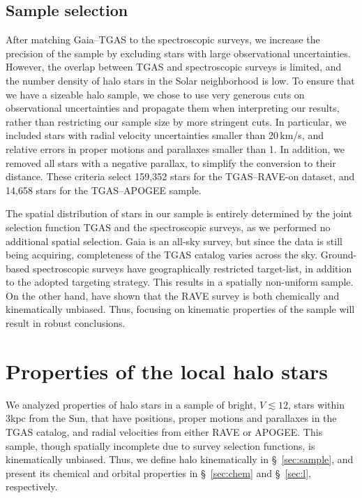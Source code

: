 \documentclass[apj, twocolappendix, numberedappendix, appendixfloats]{emulateapj}
\begin{document}
\subsection{Sample selection}
\label{sample}
After matching Gaia--TGAS to the spectroscopic surveys, we increase the precision of the sample by excluding stars with large observational uncertainties.
However, the overlap between TGAS and spectroscopic surveys is limited, and the number density of halo stars in the Solar neighborhood is low.
To ensure that we have a sizeable halo sample, we chose to use very generous cuts on observational uncertainties and propagate them when interpreting our results, rather than restricting our sample size by more stringent cuts.
In particular, we included stars with radial velocity uncertainties smaller than 20\,km/s, and relative errors in proper motions and parallaxes smaller than 1.
In addition, we removed all stars with a negative parallax, to simplify the conversion to their distance.
These criteria select 159,352 stars for the TGAS--RAVE-on dataset, and 14,658 stars for the TGAS--APOGEE sample.

The spatial distribution of stars in our sample is entirely determined by the joint selection function TGAS and the spectroscopic surveys, as we performed no additional spatial selection.
Gaia is an all-sky survey, but since the data is still being acquiring, completeness of the TGAS catalog varies across the sky.
Ground-based spectroscopic surveys have geographically restricted target-list, in addition to the adopted targeting strategy.
This results in a spatially non-uniform sample.
On the other hand, \citet{wojno2016} have shown that the RAVE survey is both chemically and kinematically unbiased.
Thus, focusing on kinematic properties of the sample will result in robust conclusions.

\section{Properties of the local halo stars}
We analyzed properties of halo stars in a sample of bright, $V\lesssim12$, stars within 3\;kpc from the Sun, that have positions, proper motions and parallaxes in the TGAS catalog, and radial velocities from either RAVE or APOGEE.
This sample, though spatially incomplete due to survey selection functions, is kinematically unbiased.
Thus, we define halo kinematically in \S~\ref{sec:sample}, and present its chemical and orbital properties in \S~\ref{sec:chem} and \S~\ref{sec:l}, respectively.
\end{document}
